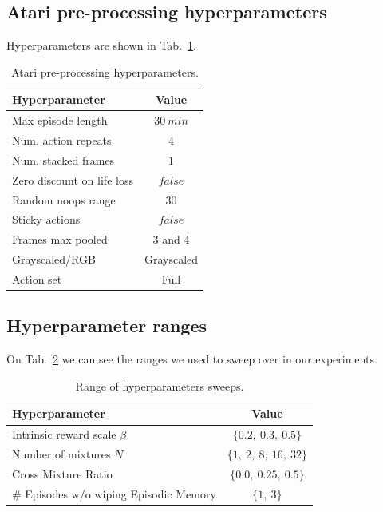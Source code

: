 \documentclass{article} %
\begin{document}
\subsection{Atari pre-processing hyperparameters}
\label{atari_hypers}
Hyperparameters are shown in Tab.~\ref{table_hyper_atari}.
\begin{table}[ht!]
\centering
\begin{tabular}{l|c}
\textbf{Hyperparameter} & \textbf{Value} \\ \hline
Max episode length & $30\ min$  \\ \hline 
Num. action repeats & $4$ \\ \hline
Num. stacked frames & $1$ \\ \hline
Zero discount on life loss & $false$ \\ \hline
Random noops range & $30$ \\ \hline
Sticky actions & $false$ \\ \hline
Frames max pooled & 3 and 4\\ \hline
Grayscaled/RGB & Grayscaled \\ \hline
Action set & Full \\ \hline
\end{tabular}
\caption{Atari pre-processing hyperparameters.}
\label{table_hyper_atari}
\vspace{-2ex}
\end{table}

\subsection{Hyperparameter ranges}
On Tab.~\ref{table_hyper_ranges} we can see the ranges we used to sweep over in our experiments.
\begin{table}[ht!]
\centering
\begin{tabular}{l|c}
\textbf{Hyperparameter} & \textbf{Value} \\ \hline
Intrinsic reward scale $\beta$ & $\{0.2,\ 0.3,\ 0.5\}$ \\ \hline
Number of mixtures $N$ & $\{1,\ 2,\ 8,\ 16,\ 32\}$ \\ \hline
Cross Mixture Ratio & $\{0.0,\ 0.25,\ 0.5\}$ \\ \hline
\# Episodes w/o wiping Episodic Memory & $\{1,\ 3\}$ \\ \hline
\end{tabular}
\caption{Range of hyperparameters sweeps.}
\label{table_hyper_ranges}
\end{table}
\end{document}
